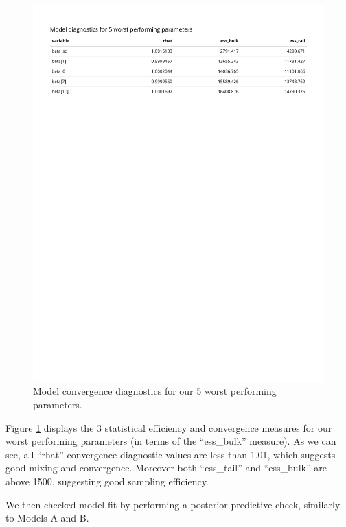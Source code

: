 \documentclass[
]{article}
\begin{document}
\begin{figure}

{\centering \includegraphics[width=1\linewidth]{../outputs/bayesian-analysis-country-freq/country-model-diagnostics} 

}

\caption{Model convergence diagnostics for our 5 worst performing parameters.}\label{fig:figs14}
\end{figure}

Figure \ref{fig:figs14} displays the 3 statistical efficiency and convergence measures for our worst performing parameters (in terms of the ``ess\_bulk'' measure). As we can see, all ``rhat'' convergence diagnostic values are less than 1.01, which suggests good mixing and convergence. Moreover both ``ess\_tail'' and ``ess\_bulk'' are above 1500, suggesting good sampling efficiency.

We then checked model fit by performing a posterior predictive check, similarly to Models A and B.
\end{document}
